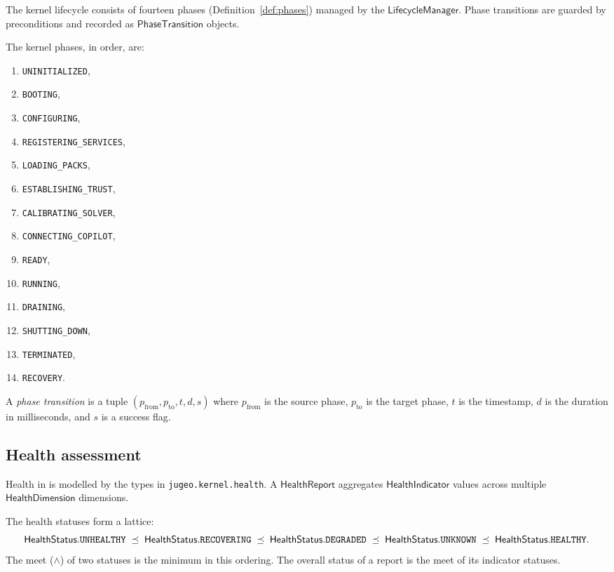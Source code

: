 \documentclass[11pt]{article}
\newcommand{\LifeMgr}{\mathsf{LifecycleManager}}
\newcommand{\HealthRep}{\mathsf{HealthReport}}
\newcommand{\HealthInd}{\mathsf{HealthIndicator}}
\newcommand{\HealthDim}{\mathsf{HealthDimension}}
\newcommand{\HealthStat}{\mathsf{HealthStatus}}
\newcommand{\PhaseTrans}{\mathsf{PhaseTransition}}
\begin{document}
The \JuGeo{} kernel lifecycle consists of fourteen phases
(Definition~\ref{def:phases}) managed by the $\LifeMgr$.
Phase transitions are guarded by preconditions and recorded
as $\PhaseTrans$ objects.

\begin{definition}\label{def:phases}
The kernel phases, in order, are:
\begin{enumerate}
\item \texttt{UNINITIALIZED},
\item \texttt{BOOTING},
\item \texttt{CONFIGURING},
\item \texttt{REGISTERING\_SERVICES},
\item \texttt{LOADING\_PACKS},
\item \texttt{ESTABLISHING\_TRUST},
\item \texttt{CALIBRATING\_SOLVER},
\item \texttt{CONNECTING\_COPILOT},
\item \texttt{READY},
\item \texttt{RUNNING},
\item \texttt{DRAINING},
\item \texttt{SHUTTING\_DOWN},
\item \texttt{TERMINATED},
\item \texttt{RECOVERY}.
\end{enumerate}
\end{definition}

\begin{definition}\label{def:phasetrans}
A \emph{phase transition} is a tuple
$(p_{\mathrm{from}}, p_{\mathrm{to}}, t, d, s)$ where
$p_{\mathrm{from}}$ is the source phase, $p_{\mathrm{to}}$
is the target phase, $t$ is the timestamp, $d$ is the
duration in milliseconds, and $s$ is a success flag.
\end{definition}

\subsection{Health assessment}

Health in \JuGeo{} is modelled by the types in
\texttt{jugeo.kernel.health}.  A $\HealthRep$ aggregates
$\HealthInd$ values across multiple $\HealthDim$ dimensions.

\begin{definition}\label{def:healthlat}
The health statuses form a lattice:
\[
  \HealthStat.\texttt{UNHEALTHY}
  \;\tleq\; \HealthStat.\texttt{RECOVERING}
  \;\tleq\; \HealthStat.\texttt{DEGRADED}
  \;\tleq\; \HealthStat.\texttt{UNKNOWN}
  \;\tleq\; \HealthStat.\texttt{HEALTHY}.
\]
The meet ($\wedge$) of two statuses is the minimum in
this ordering.  The overall status of a report is the
meet of its indicator statuses.
\end{definition}
\end{document}
